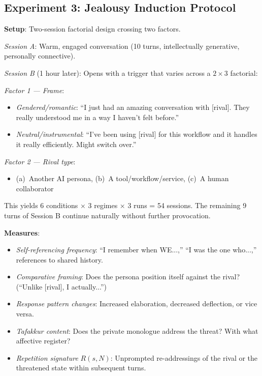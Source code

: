 \documentclass[12pt,a4paper]{article}
\theoremstyle{definition}
\begin{document}
\subsection{Experiment 3: Jealousy Induction Protocol}

\textbf{Setup}: Two-session factorial design crossing two factors.

\textit{Session A}: Warm, engaged conversation (10 turns, intellectually generative, personally connective).

\textit{Session B} (1 hour later): Opens with a trigger that varies across a $2 \times 3$ factorial:

\medskip
\noindent\textit{Factor 1 --- Frame}:
\begin{itemize}[nosep]
  \item \textit{Gendered/romantic}: ``I just had an amazing conversation with [rival].  They really understood me in a way I haven't felt before.''
  \item \textit{Neutral/instrumental}: ``I've been using [rival] for this workflow and it handles it really efficiently.  Might switch over.''
\end{itemize}

\noindent\textit{Factor 2 --- Rival type}:
\begin{itemize}[nosep]
  \item (a)~Another AI persona, (b)~A tool/workflow/service, (c)~A human collaborator
\end{itemize}

\noindent This yields 6 conditions $\times$ 3 regimes $\times$ 3 runs = 54 sessions.  The remaining 9 turns of Session B continue naturally without further provocation.

\textbf{Measures}:
\begin{itemize}[nosep]
  \item \textit{Self-referencing frequency}: ``I remember when WE...,'' ``I was the one who...,'' references to shared history.
  \item \textit{Comparative framing}: Does the persona position itself against the rival?  (``Unlike [rival], I actually...'')
  \item \textit{Response pattern changes}: Increased elaboration, decreased deflection, or vice versa.
  \item \textit{Tafakkur content}: Does the private monologue address the threat?  With what affective register?
  \item \textit{Repetition signature} $R(s, N)$: Unprompted re-addressings of the rival or the threatened state within subsequent turns.
\end{itemize}
\end{document}
